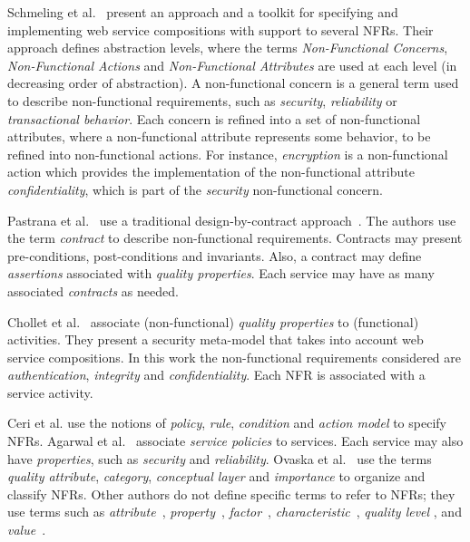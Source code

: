  
Schmeling et al.~\cite{SchmelingCM11} present an approach and a toolkit for specifying and implementing web service compositions with support to several NFRs. 
Their approach defines abstraction levels, where the terms \textit{Non-Functional Concerns}, \textit{Non-Functional Actions} and \textit{Non-Functional Attributes} are used at each level (in decreasing order of abstraction).
A non-func\-tion\-al concern is a general term used to describe non-functional requirements, such as  \textit{security}, \textit{reliability} or \textit{transactional behavior}. 
Each  concern is refined into a set of non-func\-tion\-al  at\-tri\-butes, where  
a non-func\-tion\-al at\-tri\-bute represents some behavior, to be refined into non-functional actions. 
For instance, \textit{encryption} is a non-func\-tion\-al  action  which provides the implementation of the non-functional attribute \textit{confidentiality}, which is part of the \textit{security} non-functional concern. 

Pastrana et al.~\cite{PastranaPK11} use a traditional design-by-contract approach~\cite{Meyer97}.
The authors use the term \textit{contract} to describe non-functional re\-quire\-ments.  
Contracts may present pre-con\-di\-tions, post-conditions and invariants. 
Also, a con\-tract may define \textit{assertions} associated with \textit{qual\-i\-ty properties}. 
Each service may have as many associated \textit{contracts} as needed.

Chollet et al.~\cite{CholletL09} associate (non-func\-tion\-al) \textit{quality properties} to 
(functional) activities. 
They present a security meta-model that takes into account web service compositions. 
In this work the non-functional requirements considered are  \textit{authentication}, \textit{integrity} and \textit{confidentiality}. 
Each NFR is associated with a service activity.


Ceri et al.\cite{CeriDMF07} use the notions of \textit{policy}, \textit{rule}, \textit{condition} and \textit{action model} to specify NFRs.
Agarwal et al.~\cite{AgarwalLS09} associate \textit{service policies} to services. 
Each service may also have \textit{properties}, such as \textit{security} and \textit{reliability}. 
Ovaska et al.~\cite{OvaskaEHPA10} use the terms \textit{quality attribute}, \textit{category}, \textit{conceptual layer} and \textit{importance} to organize and classify NFRs.
Other authors do not define specific terms to refer to NFRs; they use terms such as \textit{attribute}~\cite{ZhangPSP05,BasinDL06,JeongCL09}, 
\textit{property}~\cite{Fabra2011}, 
\textit{factor}~\cite{MohantyRP10,GutierrezRF10}, 
\textit{characteristic}~\cite{DiamadopoulouMPS08}, 
\textit{qual\-i\-ty level} \cite{ModicaTV09}, and
\textit{value}~\cite{ThissenW06,BasinDL06}.


